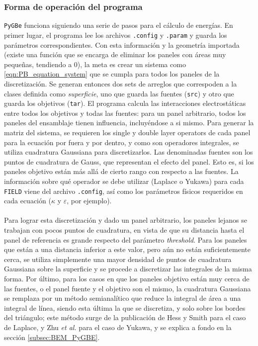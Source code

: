 \documentclass[12pt, twoside, onehalfspace, numbers, spanish]{ezthesis}
\numberwithin{equation}{section}
\begin{document}
\subsubsection{Forma de operación del programa}
\texttt{PyGBe} funciona siguiendo una serie de pasos para el cálculo de energías. En primer lugar, el programa lee los archivos \texttt{.config} y \texttt{.param} y guarda los parámetros correspondientes. Con esta información y la geometría importada (existe una función que se encarga de eliminar los paneles con áreas muy pequeñas, tendiendo a 0), la meta es crear un sistema como \ref{eqn:PB_equation_system} que se cumpla para todos los paneles de la discretización. Se generan entonces dos sets de arreglos que correspoden a la clases definida como \textit{superficie}, uno que guarda las fuentes (\texttt{src}) y otro que guarda los objetivos (\texttt{tar}). El programa calcula las interacciones electrostáticas entre todos los objetivos y todas las fuentes: para un panel arbitrario, todos los paneles del ensamblaje tienen influencia, incluyéndose a si mismo. Para generar la matriz del sistema, se requieren los single y double layer operators de cada panel para la ecuación por fuera y por dentro, y como son operadores integrales, se utiliza cuadratura Gaussiana para discretizarlos. Las denominadas fuentes son los puntos de cuadratura de Gauss, que representan el efecto del panel. Esto es, si los paneles objetivo están más allá de cierto rango con respecto a las fuentes. La información sobre qué operador se debe utilizar (Laplace o Yukawa) para cada \texttt{FIELD} viene del archivo \texttt{.config}, así como los parámetros físicos requeridos en cada ecuación ($\kappa$ y $\varepsilon$, por ejemplo).\\\\
Para lograr esta discretización y dado un panel arbitrario, los paneles lejanos se trabajan con pocos puntos de cuadratura, en vista de que su distancia hasta el panel de referencia es grande respecto del parámetro \textit{threshold}. Para los paneles que están a una distancia inferior a este valor, pero aún no están suficientemente cerca, se utiliza simplemente una mayor densidad de puntos de cuadratura Gaussiana sobre la superficie y se procede a discretizar las integrales de la misma forma. Por último, para los casos en que los paneles objetivo están muy cerca de las fuentes, o el panel fuente y el objetivo son el mismo, la cuadratura Gaussiana se remplaza por un método semianalítico que reduce la integral de área a una integral de línea, siendo esta última la que se discretiza, y solo sobre los bordes del triángulo; este método surge de la publicación de Hess y Smith \cite{Hess} para el caso de Laplace, y Zhu \textit{et al.} \cite{Zhu} para el caso de Yukawa, y se explica a fondo en la sección \ref{subsec:BEM_PyGBE}.\\\\
\end{document}

